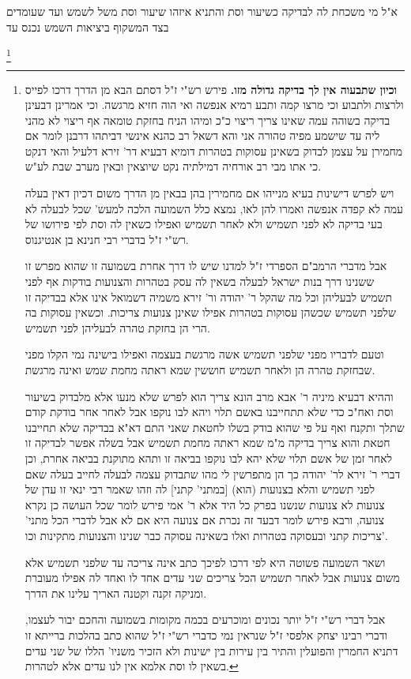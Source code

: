 \documentclass[12pt, openany]{book}
\newcommand{\footnotecomment}[1]{
	\renewcommand\thefootnote{}
	\footnote{#1}}
\newcommand{\commenta}[1]{\footnotecomment{#1}}
\begin{document}
{א"ל מי משכחת לה לבדיקה כשיעור וסת והתניא איזהו שיעור וסת משל לשמש ועד שעומדים בצד המשקוף ביציאות השמש נכנס עד
\commenta{\textbf{וכיון שתבעוה אין לך בדיקה גדולה מזו.} פירש רש"י ז"ל דסתם הבא מן הדרך דרכו לפייס ולרצות ולתבוע וכי מרצו קמה ותבע רמיא אנפשה ואי הוה חזיא מרגשה. וכי אמרינן דבעינן בדיקה בשוהה עמה שאינו צריך ריצוי כ"כ ומיהו הניח בחזקת טומאה אף ריצוי לא מהני ליה עד שישמע מפיה טהורה אני והא דשאל רב כהנא אינשי דביתהו דרבנן לומר אם מחמירן על עצמן לבדוק בשאינן עסוקות בטהרות דומיא דבעיא דר' זירא דלעיל והאי דנקט כי אתו מבי רב אורחיה דמילתיה נקט שיוצאין ובאין מערב שבת לע"ש.\par ויש לפרש דישינות בעיא מנייהו אם מחמירין בהן בבאין מן הדרך משום דכיון דאין בעלה עמה לא קפדה אנפשה ואמרו להן לאו, נמצא כלל השמועה הלכה למעש' שכל לבעלה לא בעי בדיקה לא לפני תשמיש ולא לאחר תשמיש ואפילו כשאין לה וסת לפי פירושו של רש"י ז"ל בדברי רבי חנינא בן אנטיגנוס.\par אבל מדברי הרמב"ם הספרדי ז"ל למדנו שיש לו דרך אחרת בשמועה זו שהוא מפרש זו ששנינו דרך בנות ישראל לבעלה בשאין לה עסק בטהרות והצנועות בודקות אף לפני תשמיש לבעליהן וכל מה שהקל ר' יהודה ור' זירא משמיה דשמואל אינו אלא בבדיקה זו שלפני תשמיש שכשהן עסוקות בטהרות אפילו שאינן צנועות צריכות. וכשאין עסוקות בה הרי הן בחזקת טהרה לבעליהן לפני תשמיש.\par וטעם לדבריו מפני שלפני תשמיש אשה מרגשת בעצמה ואפילו בישינה נמי הקלו מפני שבחזקת טהרה הן ולאחר תשמיש חוששין שמא ראתה מחמת שמש ואינה מרגשת.\par וההיא דבעיא מיניה ר' אבא מרב הונא צריך הוא לפרש שלא מנעו אלא מלבדוק בשיעור וסת ואח"כ כדי שלא תתחייבנו באשם תלוי ויהא לבו נוקפו אבל לאחר אחר בודקת קודם שתלך ותקנח ואף על פי שהוא בודק בשלו לחטאת שאני התם דא"א בבדיקה שלא תחייבנו חטאת והוא צריך בדיקה מ"מ שמא ראתה מחמת תשמיש אבל בשלה אפשר לבדיקה זו לאחר זמן של אשם תלוי שלא יהא לבו נוקפו בביאה זו ותהא מתוקנת בביאה אחרת, וכן דברי ר' זירא לר' יהודה כך הן מתפרשין לי מהו שתבדוק עצמה לבעלה לחייב בעלה שאם לפני תשמיש והלא בצנועות (הוא) [במתני' קתני] לה וזהו שאמר רבי ינאי זו עדן של צנועות לא צנועות שנשנו בפרק כל היד אלא ר' אמי פירש לומר שכל העושה כן נקרא צנועה, ורבא פירש לומר דבעד זה נכרת אם צנועה היא אם לא אבל לדברי הכל מתני' צריכות קתני ובעסוקה בטהרות ואלו בשאינה עסוקה כבר שנינו והצנועות מתקינות וכו'.\par ושאר השמועה פשוטה היא לפי דרכו לפיכך כתב אינה צריכה עד שלפני תשמיש אלא משום צנועות אבל לאחר תשמיש הכל צריכים שני עדים אחד לו ואחד לה אפילו מעוברת ומניקה זקנה וקטנה האריך עלינו את הדרך.\par אבל דברי רש"י ז"ל יותר נכונים ומוכרעים בכמה מקומות בשמועה והחכם יבור לעצמו, ודברי רבינו יצחק אלפסי ז"ל שנראין נמי כדברי רש"י ז"ל שהוא כתב בהלכות ברייתא זו דתניא החמרין והפועלין והתיר בין עירות בין ישינות ולא הזכיר משניו' הללו של שני עדים בשאין לו וסת אלמא אין לנו עדים אלא לטהרות. }
}
\end{document}
